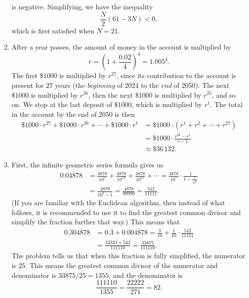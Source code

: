 \begin{enumerate}
\begin{equation*}
\end{equation*}
is negative. Simplifying, we have the inequality
\begin{equation*}
\frac{N}{2}(61 - 3N) < 0,
\end{equation*}
which is first satisfied when $N = \boxed{21}$.
\item After a year passes, the amount of money in the account is multiplied by
\begin{equation*}
r = \left(1 + \frac{0.02}{4}\right)^4 = 1.005^4.
\end{equation*}
The first $\$1000$ is multiplied by $r^{27}$, since its contribution to the account is present for $27$ years (the \emph{beginning} of 2024 to the \emph{end} of 2050). The next $\$1000$ is multiplied by $r^{26}$, then the next $\$1000$ is multiplied by $r^{25}$, and so on. We stop at the last deposit of $\$1000$, which is multiplied by $r^1$. The total in the account by the end of 2050 is then 
\begin{align*} 
\$1000\cdot r^{27} + \$1000\cdot r^{26} + \cdots + \$1000\cdot r^1 &= \$1000\cdot (r^1 + r^2 + \cdots + r^{27}) \\
&= \$1000\cdot\frac{r^{28} - r^1}{r - 1} \\
&\approx \$36\,132.
\end{align*} 
\item First, the infinite geometric series formula gives us 
\begin{align*}
0.\overline{04878} &= \frac{4878}{10^5} + \frac{4878}{10^{10}} + \frac{4878}{10^{15}} + \cdots = \frac{4878}{10^5}\cdot\frac{1}{1 - \tfrac{1}{10^5}} \\
&= \frac{4878}{10^5 - 1} = \frac{4878}{99999} = \frac{542}{11111}.
\end{align*}
(If you are familiar with the Euclidean algorithm, then instead of what follows, it is recommended to use it to find the greatest common divisor and simplify the fraction further that way.) This means that
\begin{align*}
 0.3\overline{04878} &= 0.3 + 0.0\overline{04878} = \frac{3}{10} + \frac{1}{10}\cdot\frac{542}{11111} \\
 &= \frac{33333 + 542}{111110} = \frac{33875}{111110}.
\end{align*}
The problem tells us that when this fraction is fully simplified, the numerator is $25$. This means the greatest common divisor of the numerator and denominator is $33875/25 = 1355$, and the denominator is
\begin{equation*}
\frac{111110}{1355} = \frac{22222}{271} = \boxed{82}.

\end{equation*}
\end{enumerate}
